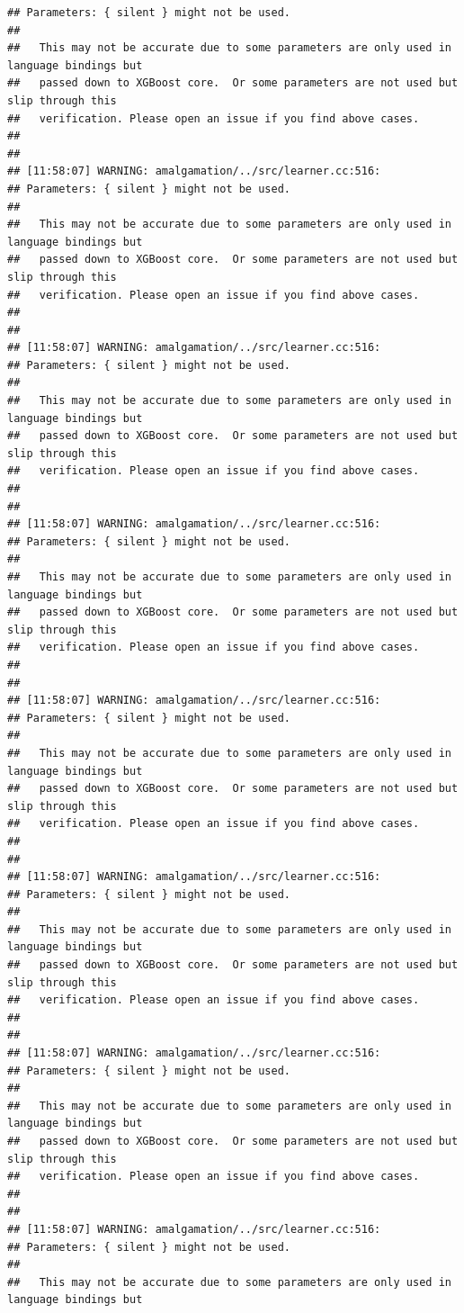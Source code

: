\documentclass[AMS,STIX2COL]{WileyNJD-v2}\usepackage[]{graphicx}\usepackage[]{color}
\makeatletter
\newenvironment{kframe}{%
 \def\at@end@of@kframe{}%
 \ifinner\ifhmode%
  \def\at@end@of@kframe{\end{minipage}}%
  \begin{minipage}{\columnwidth}%
 \fi\fi%
 \def\FrameCommand##1{\hskip\@totalleftmargin \hskip-\fboxsep
 \colorbox{shadecolor}{##1}\hskip-\fboxsep
     \hskip-\linewidth \hskip-\@totalleftmargin \hskip\columnwidth}%
 \MakeFramed {\advance\hsize-\width
   \@totalleftmargin\z@ \linewidth\hsize
   \@setminipage}}%
 {\par\unskip\endMakeFramed%
 \at@end@of@kframe}
\newenvironment{knitrout}{}{} %
\makeatother
\begin{document}
\begin{knitrout}
\begin{kframe}
\begin{verbatim}
## Parameters: { silent } might not be used.
## 
##   This may not be accurate due to some parameters are only used in language bindings but
##   passed down to XGBoost core.  Or some parameters are not used but slip through this
##   verification. Please open an issue if you find above cases.
## 
## 
## [11:58:07] WARNING: amalgamation/../src/learner.cc:516: 
## Parameters: { silent } might not be used.
## 
##   This may not be accurate due to some parameters are only used in language bindings but
##   passed down to XGBoost core.  Or some parameters are not used but slip through this
##   verification. Please open an issue if you find above cases.
## 
## 
## [11:58:07] WARNING: amalgamation/../src/learner.cc:516: 
## Parameters: { silent } might not be used.
## 
##   This may not be accurate due to some parameters are only used in language bindings but
##   passed down to XGBoost core.  Or some parameters are not used but slip through this
##   verification. Please open an issue if you find above cases.
## 
## 
## [11:58:07] WARNING: amalgamation/../src/learner.cc:516: 
## Parameters: { silent } might not be used.
## 
##   This may not be accurate due to some parameters are only used in language bindings but
##   passed down to XGBoost core.  Or some parameters are not used but slip through this
##   verification. Please open an issue if you find above cases.
## 
## 
## [11:58:07] WARNING: amalgamation/../src/learner.cc:516: 
## Parameters: { silent } might not be used.
## 
##   This may not be accurate due to some parameters are only used in language bindings but
##   passed down to XGBoost core.  Or some parameters are not used but slip through this
##   verification. Please open an issue if you find above cases.
## 
## 
## [11:58:07] WARNING: amalgamation/../src/learner.cc:516: 
## Parameters: { silent } might not be used.
## 
##   This may not be accurate due to some parameters are only used in language bindings but
##   passed down to XGBoost core.  Or some parameters are not used but slip through this
##   verification. Please open an issue if you find above cases.
## 
## 
## [11:58:07] WARNING: amalgamation/../src/learner.cc:516: 
## Parameters: { silent } might not be used.
## 
##   This may not be accurate due to some parameters are only used in language bindings but
##   passed down to XGBoost core.  Or some parameters are not used but slip through this
##   verification. Please open an issue if you find above cases.
## 
## 
## [11:58:07] WARNING: amalgamation/../src/learner.cc:516: 
## Parameters: { silent } might not be used.
## 
##   This may not be accurate due to some parameters are only used in language bindings but

\end{verbatim}
\end{kframe}
\end{knitrout}
\end{document}
